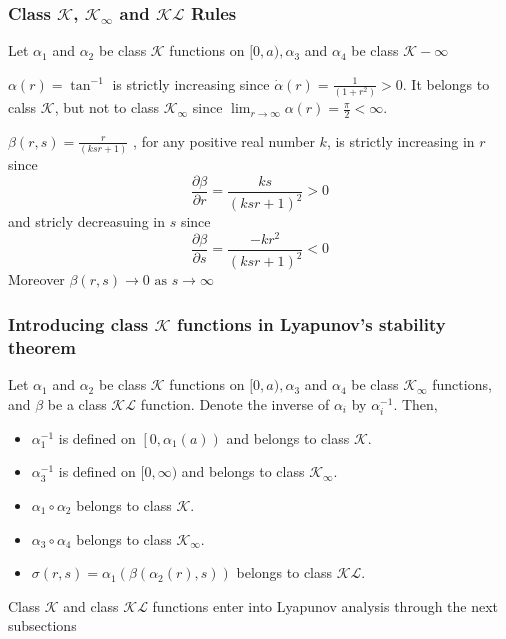 \documentclass{article}
\begin{document}
\subsubsection{Class $\mathcal{K}$, $\mathcal{K}_{\infty}$ and $\mathcal{K}\mathcal{L}$ Rules}
Let $\alpha_1$ and $\alpha_2$ be class $\mathcal{K}$ functions on $[0,a),\alpha_3$ and $\alpha_4$ be class $\mathcal{K}-\infty$
\begin{frm-ex}

\item $\alpha(r) = \tan^{-1}$ is strictly increasing since $\dot \alpha(r)=\frac{1}{(1+r^2)}>0$. It belongs to calss $\mathcal{K}$, but not to class $\mathcal{K}_{\infty}$ since $\lim_{r \rightarrow \infty} \alpha(r) = \frac{\pi}{2} < \infty$.
\end{frm-ex}
\begin{frm-ex}
\item $\beta(r,s) = \frac{r}{(ksr+1)}$ , for any positive real number $k$, is strictly increasing in $r$ since
\begin{equation*}
	\frac{\partial \beta}{\partial r} = \frac{ks}{(ksr+1)^2} > 0
\end{equation*}
and stricly decreasuing in $s$ since
\begin{equation*}
	\frac{\partial \beta}{\partial s} = \frac{-kr^2}{(ksr+1)^2} < 0
\end{equation*}
Moreover $\beta(r,s) \rightarrow 0 \text{ as } s \rightarrow \infty$
\end{frm-ex}
\subsubsection{Introducing class $\mathcal{K}$ functions in Lyapunov's stability theorem}
Let $\alpha_1$ and $\alpha_2$ be class $\mathcal{K}$ functions on $[0, a), \alpha_3$ and $\alpha_4$ be class $\mathcal{K}_{\infty}$ functions, and $\beta$ be a class $\mathcal{K} \mathcal{L}$ function. Denote the inverse of $\alpha_i$ by $\alpha_i^{-1}$. Then,
\begin{itemize}
	\item $\alpha_1^{-1}$ is defined on $\left[0, \alpha_1(a)\right)$ and belongs to class $\mathcal{K}$.
	\item $\alpha_3^{-1}$ is defined on $[0, \infty)$ and belongs to class $\mathcal{K}_{\infty}$.
	\item $\alpha_1 \circ \alpha_2$ belongs to class $\mathcal{K}$.
	\item $\alpha_3 \circ \alpha_4$ belongs to class $\mathcal{K}_{\infty}$.
	\item $\sigma(r, s)=\alpha_1\left(\beta\left(\alpha_2(r), s\right)\right)$ belongs to class $\mathcal{K} \mathcal{L}$.
\end{itemize}
Class $\mathcal{K}$ and class $\mathcal{K} \mathcal{L}$ functions enter into Lyapunov analysis through the next subsections
\end{document}
